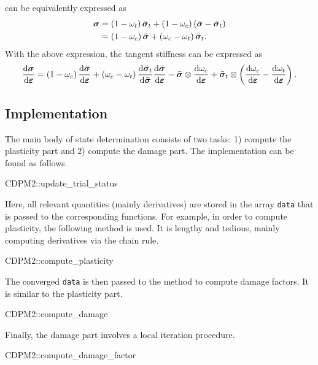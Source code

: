  can be equivalently expressed as
\begin{gather}
\begin{split}
\bm{\sigma}&=\left(1-\omega_t\right)\bar{\bm{\sigma}}_t+\left(1-\omega_c\right)\left(\bar{\bm{\sigma}}-\bar{\bm{\sigma}}_t\right)\\
&=\left(1-\omega_c\right)\bar{\bm{\sigma}}+\left(\omega_c-\omega_t\right)\bar{\bm{\sigma}}_t.
\end{split}
\end{gather}
With the above expression, the tangent stiffness can be expressed as
\begin{gather}
\dfrac{\mathrm{d}\bm{\sigma}}{\mathrm{d}\bm{\varepsilon}}=\left(1-\omega_c\right)\dfrac{\mathrm{d}\bar{\bm{\sigma}}}{\mathrm{d}\bm{\varepsilon}}+\left(\omega_c-\omega_t\right)\dfrac{\mathrm{d}\bar{\bm{\sigma}}_t}{\mathrm{d}\bar{\bm{\sigma}}}\dfrac{\mathrm{d}\bar{\bm{\sigma}}}{\mathrm{d}\bm{\varepsilon}}-\bar{\bm{\sigma}}\otimes\dfrac{\mathrm{d}\omega_c}{\mathrm{d}\bm{\varepsilon}}+\bar{\bm{\sigma}}_t\otimes\left(\dfrac{\mathrm{d}\omega_c}{\mathrm{d}\bm{\varepsilon}}-\dfrac{\mathrm{d}\omega_t}{\mathrm{d}\bm{\varepsilon}}\right).
\end{gather}
\subsection{Implementation}
The main body of state determination consists of two tasks: 1) compute the plasticity part and 2) compute the damage part.
The implementation can be found as follows.
\begin{cppcode}
CDPM2::update_trial_status
\end{cppcode}

Here, all relevant quantities (mainly derivatives) are stored in the array \texttt{data} that is passed to the corresponding functions.
For example, in order to compute plasticity, the following method is used.
It is lengthy and tedious, mainly computing derivatives via the chain rule.
\begin{cppcode}
CDPM2::compute_plasticity
\end{cppcode}

The converged \texttt{data} is then passed to the method to compute damage factors.
It is similar to the plasticity part.
\begin{cppcode}
CDPM2::compute_damage
\end{cppcode}

Finally, the damage part involves a local iteration procedure.
\begin{cppcode}
CDPM2::compute_damage_factor
\end{cppcode}
